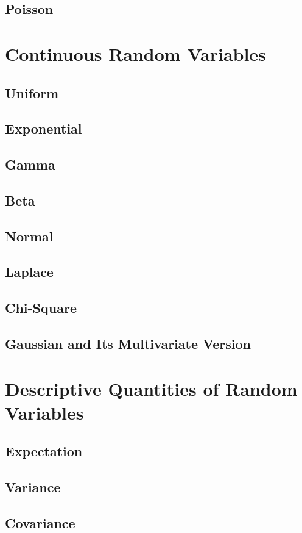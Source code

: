 \section{Poisson}

\chapter{Continuous Random Variables}
\section{Uniform}
\section{Exponential}
\section{Gamma}
\section{Beta}
\section{Normal}
\section{Laplace}
\section{Chi-Square}
\section{Gaussian and Its Multivariate Version}

\chapter{Descriptive Quantities of Random Variables}
\section{Expectation}
\section{Variance}
\section{Covariance}
